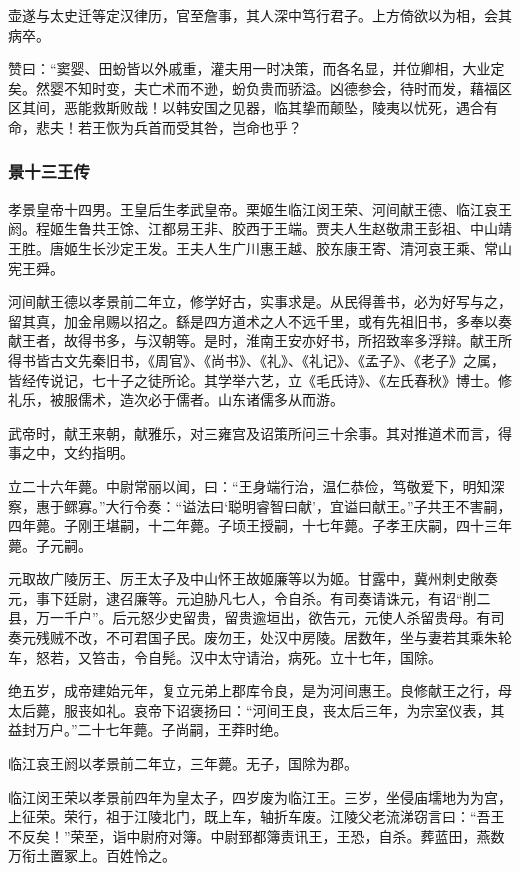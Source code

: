 \documentclass[]{article}
\begin{document}
壶遂与太史迁等定汉律历，官至詹事，其人深中笃行君子。上方倚欲以为相，会其病卒。

赞曰：``窦婴、田蚡皆以外戚重，灌夫用一时决策，而各名显，并位卿相，大业定矣。然婴不知时变，夫亡术而不逊，蚡负贵而骄溢。凶德参会，待时而发，藉福区区其间，恶能救斯败哉！以韩安国之见器，临其挚而颠坠，陵夷以忧死，遇合有命，悲夫！若王恢为兵首而受其咎，岂命也乎？

\hypertarget{header-n4350}{%
\subsubsection{景十三王传}\label{header-n4350}}

孝景皇帝十四男。王皇后生孝武皇帝。栗姬生临江闵王荣、河间献王德、临江哀王阏。程姬生鲁共王馀、江都易王非、胶西于王端。贾夫人生赵敬肃王彭祖、中山靖王胜。唐姬生长沙定王发。王夫人生广川惠王越、胶东康王寄、清河哀王乘、常山宪王舜。

河间献王德以孝景前二年立，修学好古，实事求是。从民得善书，必为好写与之，留其真，加金帛赐以招之。繇是四方道术之人不远千里，或有先祖旧书，多奉以奏献王者，故得书多，与汉朝等。是时，淮南王安亦好书，所招致率多浮辩。献王所得书皆古文先秦旧书，《周官》、《尚书》、《礼》、《礼记》、《孟子》、《老子》之属，皆经传说记，七十子之徒所论。其学举六艺，立《毛氏诗》、《左氏春秋》博士。修礼乐，被服儒术，造次必于儒者。山东诸儒多从而游。

武帝时，献王来朝，献雅乐，对三雍宫及诏策所问三十余事。其对推道术而言，得事之中，文约指明。

立二十六年薨。中尉常丽以闻，曰：``王身端行治，温仁恭俭，笃敬爱下，明知深察，惠于鳏寡。''大行令奏：``谥法曰`聪明睿智曰献'，宜谥曰献王。''子共王不害嗣，四年薨。子刚王堪嗣，十二年薨。子顷王授嗣，十七年薨。子孝王庆嗣，四十三年薨。子元嗣。

元取故广陵厉王、厉王太子及中山怀王故姬廉等以为姬。甘露中，冀州刺史敞奏元，事下廷尉，逮召廉等。元迫胁凡七人，令自杀。有司奏请诛元，有诏``削二县，万一千户''。后元怒少史留贵，留贵逾垣出，欲告元，元使人杀留贵母。有司奏元残贼不改，不可君国子民。废勿王，处汉中房陵。居数年，坐与妻若其乘朱轮车，怒若，又笞击，令自髡。汉中太守请治，病死。立十七年，国除。

绝五岁，成帝建始元年，复立元弟上郡库令良，是为河间惠王。良修献王之行，母太后薨，服丧如礼。哀帝下诏褒扬曰：``河间王良，丧太后三年，为宗室仪表，其益封万户。''二十七年薨。子尚嗣，王莽时绝。

临江哀王阏以孝景前二年立，三年薨。无子，国除为郡。

临江闵王荣以孝景前四年为皇太子，四岁废为临江王。三岁，坐侵庙壖地为为宫，上征荣。荣行，祖于江陵北门，既上车，轴折车废。江陵父老流涕窃言曰：``吾王不反矣！''荣至，诣中尉府对簿。中尉郅都簿责讯王，王恐，自杀。葬蓝田，燕数万衔土置冢上。百姓怜之。
\end{document}

